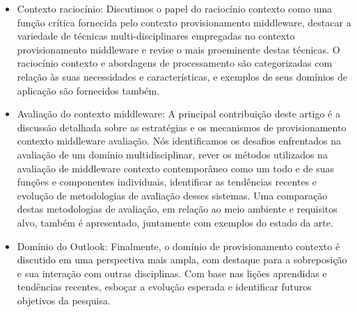 \documentclass[12pt]{article} %
\begin{document}
\begin{itemize}
	\item Contexto raciocínio: Discutimos o papel do raciocínio contexto como uma função crítica fornecida pelo contexto provisionamento middleware, destacar a variedade de técnicas multi-disciplinares empregadas no contexto provisionamento middleware e revise o mais proeminente destas técnicas. O raciocínio contexto e abordagens de processamento são categorizadas com relação às suas necessidades e características, e exemplos de seus domínios de aplicação são fornecidos também.
	\item Avaliação do contexto middleware: A principal contribuição deste artigo é a discussão detalhada sobre as estratégias e os mecanismos de provisionamento contexto middleware avaliação. Nós identificamos os desafios enfrentados na avaliação de um domínio multidisciplinar, rever os métodos utilizados na avaliação de middleware contexto contemporâneo como um todo e de suas funções e componentes individuais, identificar as tendências recentes e evolução de metodologias de avaliação desses sistemas. Uma comparação destas metodologias de avaliação, em relação ao meio ambiente e requisitos alvo, também é apresentado, juntamente com exemplos do estado da arte.
	\item Domínio do Outlook: Finalmente, o domínio de provisionamento contexto é discutido em uma perspectiva mais ampla, com destaque para a sobreposição e sua interação com outras disciplinas. Com base nas lições aprendidas e tendências recentes, esboçar a evolução esperada e identificar futuros objetivos da pesquisa.
\end{itemize}
\end{document}
